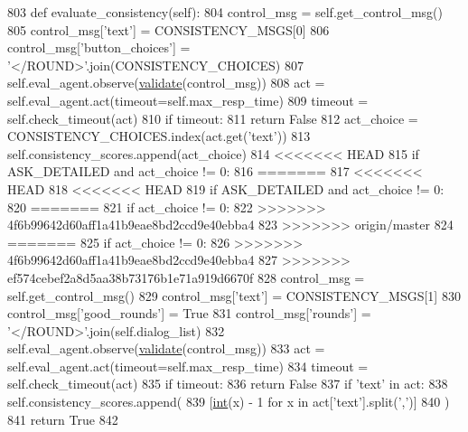 \begin{DoxyCode}
803     \textcolor{keyword}{def }evaluate\_consistency(self):
804         control\_msg = self.get\_control\_msg()
805         control\_msg[\textcolor{stringliteral}{'text'}] = CONSISTENCY\_MSGS[0]
806         control\_msg[\textcolor{stringliteral}{'button\_choices'}] = \textcolor{stringliteral}{'</ROUND>'}.join(CONSISTENCY\_CHOICES)
807         self.eval\_agent.observe(\hyperlink{namespaceparlai_1_1core_1_1worlds_afc3fad603b7bce41dbdc9cdc04a9c794}{validate}(control\_msg))
808         act = self.eval\_agent.act(timeout=self.max\_resp\_time)
809         timeout = self.check\_timeout(act)
810         \textcolor{keywordflow}{if} timeout:
811             \textcolor{keywordflow}{return} \textcolor{keyword}{False}
812         act\_choice = CONSISTENCY\_CHOICES.index(act.get(\textcolor{stringliteral}{'text'}))
813         self.consistency\_scores.append(act\_choice)
814 <<<<<<< HEAD
815         \textcolor{keywordflow}{if} ASK\_DETAILED \textcolor{keywordflow}{and} act\_choice != 0:
816 =======
817 <<<<<<< HEAD
818 <<<<<<< HEAD
819         \textcolor{keywordflow}{if} ASK\_DETAILED \textcolor{keywordflow}{and} act\_choice != 0:
820 =======
821         \textcolor{keywordflow}{if} act\_choice != 0:
822 >>>>>>> 4f6b99642d60aff1a41b9eae8bd2ccd9e40ebba4
823 >>>>>>> origin/master
824 =======
825         \textcolor{keywordflow}{if} act\_choice != 0:
826 >>>>>>> 4f6b99642d60aff1a41b9eae8bd2ccd9e40ebba4
827 >>>>>>> ef574cebef2a8d5aa38b73176b1e71a919d6670f
828             control\_msg = self.get\_control\_msg()
829             control\_msg[\textcolor{stringliteral}{'text'}] = CONSISTENCY\_MSGS[1]
830             control\_msg[\textcolor{stringliteral}{'good\_rounds'}] = \textcolor{keyword}{True}
831             control\_msg[\textcolor{stringliteral}{'rounds'}] = \textcolor{stringliteral}{'</ROUND>'}.join(self.dialog\_list)
832             self.eval\_agent.observe(\hyperlink{namespaceparlai_1_1core_1_1worlds_afc3fad603b7bce41dbdc9cdc04a9c794}{validate}(control\_msg))
833             act = self.eval\_agent.act(timeout=self.max\_resp\_time)
834             timeout = self.check\_timeout(act)
835             \textcolor{keywordflow}{if} timeout:
836                 \textcolor{keywordflow}{return} \textcolor{keyword}{False}
837             \textcolor{keywordflow}{if} \textcolor{stringliteral}{'text'} \textcolor{keywordflow}{in} act:
838                 self.consistency\_scores.append(
839                     [\hyperlink{namespacelanguage__model_1_1eval__ppl_a7d12ee00479673c5c8d1f6d01faa272a}{int}(x) - 1 \textcolor{keywordflow}{for} x \textcolor{keywordflow}{in} act[\textcolor{stringliteral}{'text'}].split(\textcolor{stringliteral}{','})]
840                 )
841         \textcolor{keywordflow}{return} \textcolor{keyword}{True}
842 
\end{DoxyCode}
